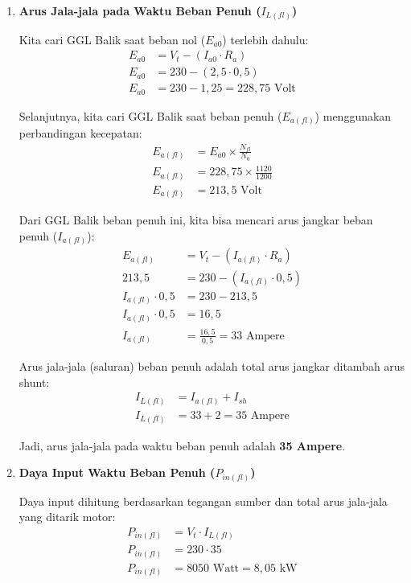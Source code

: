 \documentclass[12pt, a4paper]{article}
\begin{document}
\begin{enumerate}[label=\alph*.]
    \item \textbf{Arus Jala-jala pada Waktu Beban Penuh ($I_{L(fl)}$)}

    Kita cari GGL Balik saat beban nol ($E_{a0}$) terlebih dahulu:
    \begin{align*}
        E_{a0} &= V_t - (I_{a0} \cdot R_a) \\
        E_{a0} &= 230 - (2,5 \cdot 0,5) \\
        E_{a0} &= 230 - 1,25 = 228,75 \text{ Volt}
    \end{align*}

    Selanjutnya, kita cari GGL Balik saat beban penuh ($E_{a(fl)}$) menggunakan perbandingan kecepatan:
    \begin{align*}
        E_{a(fl)} &= E_{a0} \times \frac{N_{fl}}{N_0} \\
        E_{a(fl)} &= 228,75 \times \frac{1120}{1200} \\
        E_{a(fl)} &= 213,5 \text{ Volt}
    \end{align*}

    Dari GGL Balik beban penuh ini, kita bisa mencari arus jangkar beban penuh ($I_{a(fl)}$):
    \begin{align*}
        E_{a(fl)} &= V_t - (I_{a(fl)} \cdot R_a) \\
        213,5 &= 230 - (I_{a(fl)} \cdot 0,5) \\
        I_{a(fl)} \cdot 0,5 &= 230 - 213,5 \\
        I_{a(fl)} \cdot 0,5 &= 16,5 \\
        I_{a(fl)} &= \frac{16,5}{0,5} = 33 \text{ Ampere}
    \end{align*}

    Arus jala-jala (saluran) beban penuh adalah total arus jangkar ditambah arus shunt:
    \begin{align*}
        I_{L(fl)} &= I_{a(fl)} + I_{sh} \\
        I_{L(fl)} &= 33 + 2 = 35 \text{ Ampere}
    \end{align*}

    Jadi, arus jala-jala pada waktu beban penuh adalah \textbf{35 Ampere}.

    \item \textbf{Daya Input Waktu Beban Penuh ($P_{in(fl)}$)}

    Daya input dihitung berdasarkan tegangan sumber dan total arus jala-jala yang ditarik motor:
    \begin{align*}
        P_{in(fl)} &= V_t \cdot I_{L(fl)} \\
        P_{in(fl)} &= 230 \cdot 35 \\
        P_{in(fl)} &= 8050 \text{ Watt} = 8,05 \text{ kW}
    \end{align*}


\end{enumerate}
\end{document}

